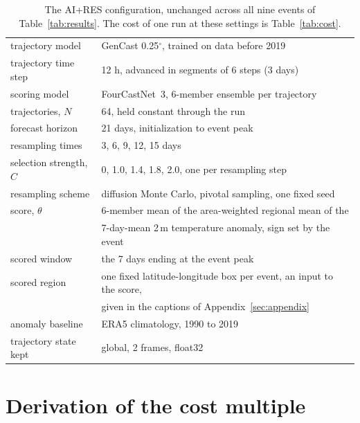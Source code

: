 \documentclass[11pt]{article}
\begin{document}
\begin{table}[h]
\centering\small\setlength{\tabcolsep}{7pt}
\caption{The AI+RES configuration, unchanged across all nine events of
Table~\ref{tab:results}. The cost of one run at these settings is Table~\ref{tab:cost}.}
\label{tab:hyper}
\begin{tabular}{@{}ll@{}}
\toprule
trajectory model      & GenCast 0.25$^\circ$, trained on data before 2019 \\
trajectory time step  & 12 h, advanced in segments of 6 steps (3 days) \\
scoring model         & FourCastNet~3, 6-member ensemble per trajectory \\
trajectories, $N$     & 64, held constant through the run \\
forecast horizon      & 21 days, initialization to event peak \\
resampling times      & 3, 6, 9, 12, 15 days \\
selection strength, $C$ & 0, 1.0, 1.4, 1.8, 2.0, one per resampling step \\
resampling scheme     & diffusion Monte Carlo, pivotal sampling, one fixed seed \\
score, $\theta$       & 6-member mean of the area-weighted regional mean of the \\
                      & 7-day-mean 2\,m temperature anomaly, sign set by the event \\
scored window         & the 7 days ending at the event peak \\
scored region         & one fixed latitude-longitude box per event, an input to the score, \\
                      & given in the captions of Appendix~\ref{sec:appendix} \\
anomaly baseline      & ERA5 climatology, 1990 to 2019 \\
trajectory state kept & global, 2 frames, float32 \\
\bottomrule
\end{tabular}
\end{table}

\section{Derivation of the cost multiple}
\label{sec:costmath}
\end{document}
